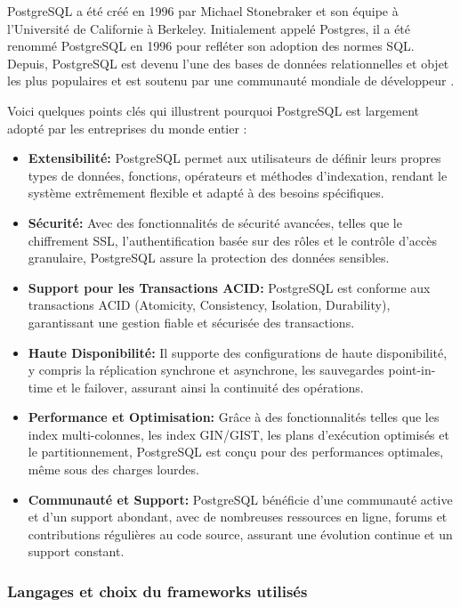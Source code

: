 \documentclass[12pt]{report}
\begin{document}
				PostgreSQL a été créé en 1996 par Michael Stonebraker et son équipe à l'Université de Californie à Berkeley. Initialement appelé Postgres, il a été renommé PostgreSQL en 1996 pour refléter son adoption des normes SQL. Depuis, PostgreSQL est devenu l'une des bases de données relationnelles et objet les plus populaires et est soutenu par une communauté mondiale de développeur \cite{PostgreSQLExperience}.

				Voici quelques points clés qui illustrent pourquoi PostgreSQL est largement adopté par les entreprises du monde entier :

				\begin{itemize}
					\item \textbf{Extensibilité:} PostgreSQL permet aux utilisateurs de définir leurs propres types de données, fonctions, opérateurs et méthodes d'indexation, rendant le système extrêmement flexible et adapté à des besoins spécifiques.
					\item \textbf{Sécurité:} Avec des fonctionnalités de sécurité avancées, telles que le chiffrement SSL, l'authentification basée sur des rôles et le contrôle d'accès granulaire, PostgreSQL assure la protection des données sensibles.
					\item \textbf{Support pour les Transactions ACID:} PostgreSQL est conforme aux transactions ACID (Atomicity, Consistency, Isolation, Durability), garantissant une gestion fiable et sécurisée des transactions.
					\item \textbf{Haute Disponibilité:} Il supporte des configurations de haute disponibilité, y compris la réplication synchrone et asynchrone, les sauvegardes point-in-time et le failover, assurant ainsi la continuité des opérations.
					\item \textbf{Performance et Optimisation:} Grâce à des fonctionnalités telles que les index multi-colonnes, les index GIN/GIST, les plans d'exécution optimisés et le partitionnement, PostgreSQL est conçu pour des performances optimales, même sous des charges lourdes.
					\item \textbf{Communauté et Support:} PostgreSQL bénéficie d'une communauté active et d'un support abondant, avec de nombreuses ressources en ligne, forums et contributions régulières au code source, assurant une évolution continue et un support constant.
				\end{itemize}

				\subsubsection{Langages et choix du frameworks utilisés}
\end{document}
